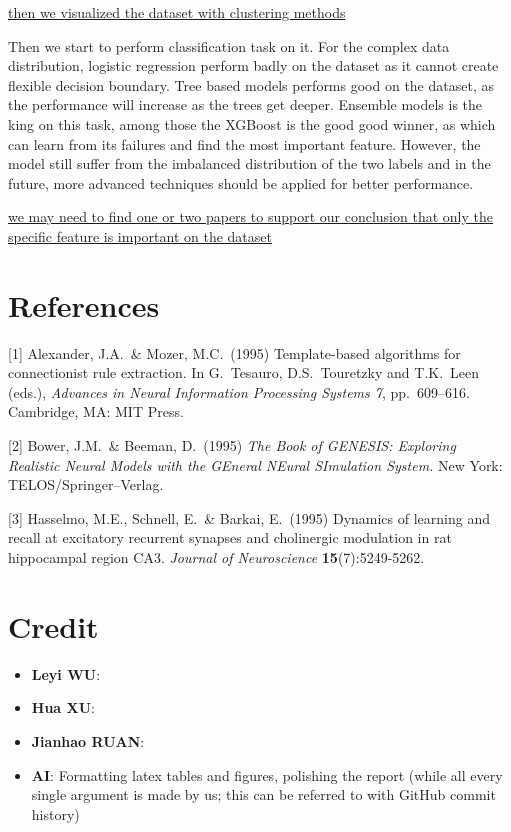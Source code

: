 \documentclass{article}
\begin{document}
\underline{then we visualized the dataset with clustering methods}

Then we start to perform classification task on it. For the complex data distribution, logistic regression perform badly on the dataset as it cannot create flexible decision boundary. Tree based models performs good on the dataset, as the performance will increase as the trees get deeper. Ensemble models is the king on this task, among those the XGBoost is the good good winner, as which can learn from its failures and find the most important feature. However, the model still suffer from the
imbalanced distribution of the two labels and in the future, more advanced techniques should be applied for better performance.

\underline{we may need to find one or two papers to support our conclusion that only the specific feature is important on the dataset}





\label{conclusion}

\section*{References}
{
\small


[1] Alexander, J.A.\ \& Mozer, M.C.\ (1995) Template-based algorithms for
connectionist rule extraction. In G.\ Tesauro, D.S.\ Touretzky and T.K.\ Leen
(eds.), {\it Advances in Neural Information Processing Systems 7},
pp.\ 609--616. Cambridge, MA: MIT Press.


[2] Bower, J.M.\ \& Beeman, D.\ (1995) {\it The Book of GENESIS: Exploring
  Realistic Neural Models with the GEneral NEural SImulation System.}  New York:
TELOS/Springer--Verlag.


[3] Hasselmo, M.E., Schnell, E.\ \& Barkai, E.\ (1995) Dynamics of learning and
recall at excitatory recurrent synapses and cholinergic modulation in rat
hippocampal region CA3. {\it Journal of Neuroscience} {\bf 15}(7):5249-5262.
}

\section*{Credit}
\begin{itemize}
    \item \textbf{Leyi WU}: 
    \item \textbf{Hua XU}: 
    \item \textbf{Jianhao RUAN}:
    \item \textbf{AI}: Formatting latex tables and figures, polishing the report (while all every single argument is made by us; this can be referred to with GitHub commit history)

\end{itemize}
\end{document}

